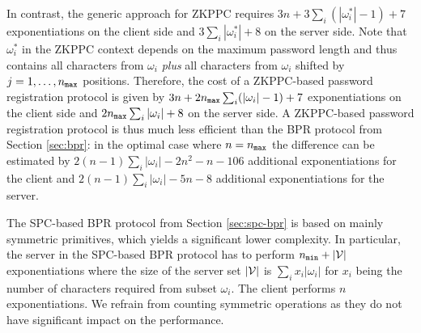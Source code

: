 In contrast, the generic approach for \ac{ZKPPC} requires $3n+3\sum_i (|\omega^\ast_i|-1)+7$ exponentiations on the client side and $3\sum_i |\omega^\ast_i|+8$ on the server side.
Note that $\omega^\ast_i$ in the \ac{ZKPPC} context depends on the maximum password length and thus contains all characters from $\omega_i$ \emph{plus} all characters from $\omega_i$ shifted by $j = 1,\ldots, {n_\mathtt{max}}$ positions.
Therefore, the cost of a \ac{ZKPPC}-based password registration protocol is given by $3n+2{n_\mathtt{max}}\sum_i (|\omega_i|-1)+7$ exponentiations on the client side and $2{n_\mathtt{max}}\sum_i |\omega_i|+8$ on the server side. 
A \ac{ZKPPC}-based password registration protocol is thus much less efficient than the \ac{BPR} protocol from Section \ref{sec:bpr}: in the optimal case where $n={n_\mathtt{max}}$ the difference can be estimated by  $2(n-1)\sum_i|\omega_i| - 2n^2 - n - 106$ additional exponentiations for the client and $2(n-1)\sum_i|\omega_i| - 5n - 8$ additional exponentiations for the server.

The \ac{SPC}-based \ac{BPR} protocol from Section \ref{sec:spc-bpr} is based on mainly symmetric primitives, which yields a significant lower complexity.
In particular, the server in the \ac{SPC}-based \ac{BPR} protocol has to perform ${n_\mathtt{min}}+|\mathcal{V}|$ exponentiations where the size of the server set $|\mathcal{V}|$ is $\sum_i x_i|\omega_i|$ for $x_i$ being the number of characters required from subset $\omega_i$.
The client performs $n$ exponentiations.
We refrain from counting symmetric operations as they do not have significant impact on the performance.


